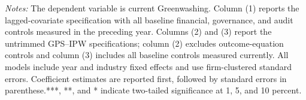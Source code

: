 \documentclass[11pt]{article}
\begin{document}
\begin{table}[H]
    \centering
    \caption{Lagged Covariate and GPS--IPW Regressions}
    \label{tab:endogeneity-regressions}
    \par\smallskip
    \begin{minipage}{0.95\textwidth}
        \footnotesize
        \textit{Notes:} The dependent variable is current Greenwashing. Column (1) reports the lagged-covariate specification with all baseline financial, governance, and audit controls measured in the preceding year. Columns (2) and (3) report the untrimmed GPS--IPW specifications; column (2) excludes outcome-equation controls and column (3) includes all baseline controls measured currently. All models include year and industry fixed effects and use firm-clustered standard errors. Coefficient estimates are reported first, followed by standard errors
        in parenthese.***, **, and * indicate two-tailed significance at 1, 5, and 10 percent.
    \end{minipage}
\end{table}
\end{document}
